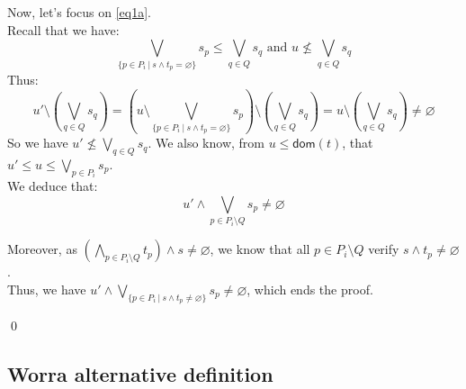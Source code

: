 \documentclass[a4paper]{article}%
\newcommand{\dom}[1]{\textsf{dom}(#1)}
\newcommand{\alt}{~|~}
\begin{document}
    Now, let's focus on \cref{eq1a}.\\
    Recall that we have:
    \[ \bigvee_{\{p \in P_i \alt s \land t_p = \varnothing\}}s_p \leq \bigvee_{q \in Q}s_q 
    \text{\ \ \ and\ \ \ } u \not\leq\bigvee_{q\in Q}s_q \]
    Thus:
    \[ u' \setminus \left(\bigvee_{q \in Q}s_q\right) = \left(u \setminus \bigvee_{\{p \in P_i \alt s \land t_p = \varnothing\}}s_p\right) \setminus \left(\bigvee_{q \in Q}s_q\right) = u \setminus \left(\bigvee_{q \in Q}s_q\right) \neq \varnothing \]
    So we have $ u' \not\leq\bigvee_{q\in Q}s_q $. We also know, from $u \leq \dom t$, that $u' \leq u \leq \bigvee_{p\in P_i}s_p$.\\

    We deduce that:
    \[ u' \land \bigvee_{p\in P_i \setminus Q}s_p \neq \varnothing \]

    Moreover, as $(\bigwedge_{p\in P_i\setminus Q}t_p) \land s \neq \varnothing$, we know that all $p \in P_i \setminus Q$ verify $s \land t_p \neq \varnothing$.\\
    Thus, we have $u' \land \bigvee_{\{p\in P_i\alt s\wedge t_p\not=\varnothing\}}s_p \neq \varnothing$, which ends the proof.
    
    \qed

    \pagebreak

    \subsection{Worra alternative definition}
\end{document}

